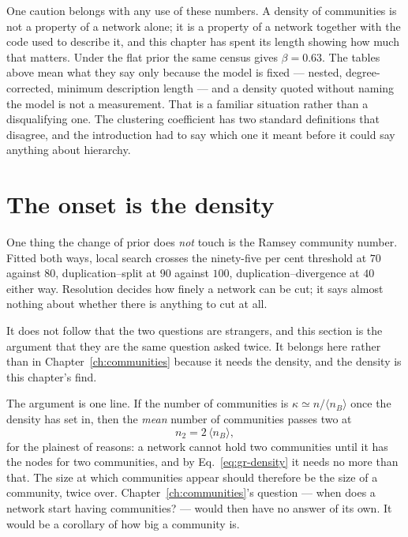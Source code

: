 One caution belongs with any use of these numbers. A density of communities is
not a property of a network alone; it is a property of a network together with the
code used to describe it, and this chapter has spent its length showing how much
that matters. Under the flat prior the same census gives $\beta=0.63$. The tables
above mean what they say only because the model is fixed --- nested,
degree-corrected, minimum description length --- and a density quoted without
naming the model is not a measurement. That is a familiar situation rather than a
disqualifying one. The clustering coefficient has two standard definitions that
disagree, and the introduction had to say which one it meant before it could say
anything about hierarchy.

\section{The onset is the density}
\label{sec:gr-onset}

One thing the change of prior does \emph{not} touch is the Ramsey community
number. Fitted both ways, local search crosses the ninety-five per cent threshold
at $70$ against $80$, duplication--split at $90$ against $100$,
duplication--divergence at $40$ either way. Resolution decides how finely a
network can be cut; it says almost nothing about whether there is anything to cut
at all.

It does not follow that the two questions are strangers, and this section is the
argument that they are the same question asked twice. It belongs here rather than
in Chapter~\ref{ch:communities} because it needs the density, and the density is
this chapter's find.

The argument is one line. If the number of communities is $\kappa\simeq
n/\langle n_B\rangle$ once the density has set in, then the \emph{mean} number of
communities passes two at
\begin{equation}
  n_2 = 2\,\langle n_B\rangle,
  \label{eq:gr-ntwo}
\end{equation}
for the plainest of reasons: a network cannot hold two communities until it has
the nodes for two communities, and by Eq.~\eqref{eq:gr-density} it needs no more
than that. The size at which communities appear should therefore be the size of a
community, twice over. Chapter~\ref{ch:communities}'s question --- when does a
network start having communities? --- would then have no answer of its own. It
would be a corollary of how big a community is.

